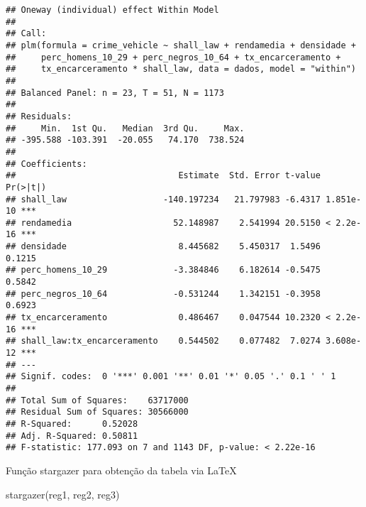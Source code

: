 \documentclass[
]{article}
\newenvironment{Shaded}{\begin{snugshade}}{\end{snugshade}}
\newcommand{\FunctionTok}[1]{\textcolor[rgb]{0.00,0.00,0.00}{#1}}
\newcommand{\NormalTok}[1]{#1}
\begin{document}
\begin{verbatim}
## Oneway (individual) effect Within Model
## 
## Call:
## plm(formula = crime_vehicle ~ shall_law + rendamedia + densidade + 
##     perc_homens_10_29 + perc_negros_10_64 + tx_encarceramento + 
##     tx_encarceramento * shall_law, data = dados, model = "within")
## 
## Balanced Panel: n = 23, T = 51, N = 1173
## 
## Residuals:
##     Min.  1st Qu.   Median  3rd Qu.     Max. 
## -395.588 -103.391  -20.055   74.170  738.524 
## 
## Coefficients:
##                                Estimate  Std. Error t-value  Pr(>|t|)    
## shall_law                   -140.197234   21.797983 -6.4317 1.851e-10 ***
## rendamedia                    52.148987    2.541994 20.5150 < 2.2e-16 ***
## densidade                      8.445682    5.450317  1.5496    0.1215    
## perc_homens_10_29             -3.384846    6.182614 -0.5475    0.5842    
## perc_negros_10_64             -0.531244    1.342151 -0.3958    0.6923    
## tx_encarceramento              0.486467    0.047544 10.2320 < 2.2e-16 ***
## shall_law:tx_encarceramento    0.544502    0.077482  7.0274 3.608e-12 ***
## ---
## Signif. codes:  0 '***' 0.001 '**' 0.01 '*' 0.05 '.' 0.1 ' ' 1
## 
## Total Sum of Squares:    63717000
## Residual Sum of Squares: 30566000
## R-Squared:      0.52028
## Adj. R-Squared: 0.50811
## F-statistic: 177.093 on 7 and 1143 DF, p-value: < 2.22e-16
\end{verbatim}

Função stargazer para obtenção da tabela via \LaTeX

\begin{Shaded}
\begin{Highlighting}[]
\FunctionTok{stargazer}\NormalTok{(reg1, reg2, reg3)}
\end{Highlighting}
\end{Shaded}
\end{document}
